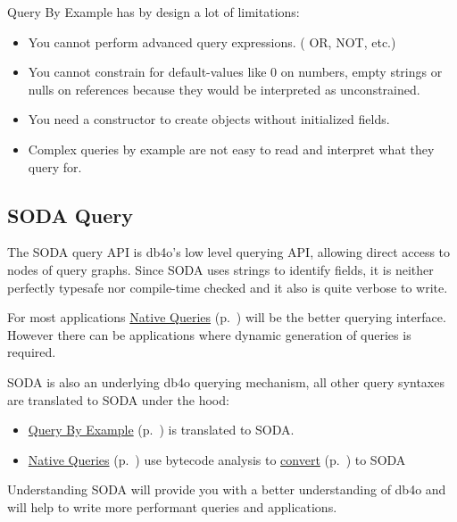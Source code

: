 Query By Example has by design a lot of limitations:

\begin{itemize}
\item You cannot perform advanced query expressions. ( OR, NOT, etc.)
\item You cannot constrain for default-values like 0 on numbers, empty strings or nulls on references because they would be interpreted as unconstrained.
\item You need a constructor to create objects without initialized fields.
\item Complex queries by example are not easy to read and interpret what they query for.
\end{itemize}

\subsection{SODA Query}
\label{ref:basics-querying-soda-query}

The SODA query API is db4o's low level querying API, allowing direct access to nodes of query graphs. Since SODA uses strings to identify fields, it is neither perfectly typesafe nor compile-time checked and it also is quite verbose to write.

For most applications \hyperref[ref:basics-querying-native-queries]{Native Queries} (p.~\pageref{ref:basics-querying-native-queries}) will be the better querying interface. However there can be applications where dynamic generation of queries is required.

SODA is also an underlying db4o querying mechanism, all other query syntaxes are translated to SODA under the hood:

\begin{itemize}
\item \hyperref[ref:basics-querying-query-by-example]{Query By Example} (p.~\pageref{ref:basics-querying-query-by-example}) is translated to SODA.
\item \hyperref[ref:basics-querying-native-queries]{Native Queries} (p.~\pageref{ref:basics-querying-native-queries}) use bytecode analysis to \hyperref[ref:basics-querying-native-queries-native-query-optimization]{convert} (p.~\pageref{ref:basics-querying-native-queries-native-query-optimization}) to SODA
\end{itemize}

Understanding SODA will provide you with a better understanding of db4o and will help to write more performant queries and applications.

